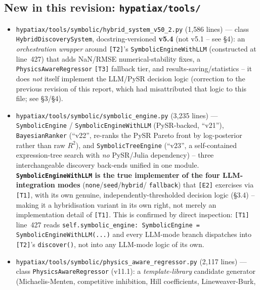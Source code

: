 \documentclass[11pt,a4paper]{article}
\newcommand{\code}[1]{\texttt{\small #1}}
\begin{document}
\subsection{New in this revision: \code{hypatiax/tools/}}
\begin{itemize}[leftmargin=1.4cm]
  \item[\code{[T1]}] \code{hypatiax/tools/symbolic/hybrid\_system\_v50\_2.py}
        (1{,}586 lines) --- class \code{HybridDiscoverySystem}, docstring-versioned
        \textbf{v5.4} (not v5.1 -- see \S4): an \emph{orchestration wrapper}
        around \code{[T2]}'s \code{SymbolicEngineWithLLM} (constructed at
        line~427) that adds NaN/RMSE numerical-stability fixes, a
        \code{PhysicsAwareRegressor} \code{[T3]} fallback tier, and
        results-saving/statistics -- it does \emph{not} itself implement the
        LLM/PySR decision logic (correction to the previous revision of
        this report, which had misattributed that logic to this file; see
        \S3/\S4).
  \item[\code{[T2]}] \code{hypatiax/tools/symbolic/symbolic\_engine.py}
        (3{,}235 lines) --- \code{SymbolicEngine} / \code{SymbolicEngineWithLLM}
        (PySR-backed, ``v21''), \code{BayesianRanker} (``v22'', re-ranks the
        PySR Pareto front by log-posterior rather than raw $R^2$), and
        \code{SymbolicTreeEngine} (``v23'', a self-contained expression-tree
        search with \emph{no} PySR/Julia dependency) -- three
        interchangeable discovery back-ends unified in one module.
        \textbf{\code{SymbolicEngineWithLLM} is the true implementer of the
        four LLM-integration modes} (\code{none}/\code{seed}/\code{hybrid}/
        \code{fallback}) that \code{[E2]} exercises via \code{[T1]}, with
        its own genuine, independently-thresholded decision logic (\S3.4)
        -- making it a hybridisation variant in its own right, not merely
        an implementation detail of \code{[T1]}. This is confirmed by
        direct inspection: \code{[T1]} line~427 reads
        \code{self.symbolic\_engine: SymbolicEngine = SymbolicEngineWithLLM(...)}
        and every LLM-mode branch dispatches into \code{[T2]}'s
        \code{discover()}, not into any LLM-mode logic of its own.
  \item[\code{[T3]}] \code{hypatiax/tools/symbolic/physics\_aware\_regressor.py}
        (2{,}117 lines) --- class \code{PhysicsAwareRegressor} (v11.1): a
        \emph{template-library} candidate generator (Michaelis-Menten,
        competitive inhibition, Hill coefficients, Lineweaver-Burk,

\end{itemize}
\end{document}

